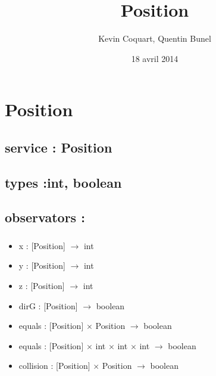 \documentclass[11pt]{article}
\title{Position}
\author{Kevin Coquart, Quentin Bunel}
\date{18 avril 2014}
\begin{document}
\maketitle

\setcounter{tocdepth}{3}
\tableofcontents
\vspace*{1cm}
\section{Position}
\label{sec-1}

\subsection{service : Position}
\label{sec-1.1}

\subsection{types :int, boolean}
\label{sec-1.2}


\subsection{observators :}
\label{sec-1.3}

\subsubsection{}

\begin{itemize}

\item x : [Position] $\to$ int\\
\label{sec-1.3.1.1}


\item y : [Position] $\to$ int\\
\label{sec-1.3.1.2}


\item z : [Position] $\to$ int\\
\label{sec-1.3.1.3}


\item dirG : [Position] $\to$ boolean\\
\label{sec-1.3.1.4}


\item equals : [Position] $\times$ Position $\to$ boolean\\
\label{sec-1.3.1.5}


\item equals : [Position] $\times$ int $\times$ int $\times$ int $\to$ boolean\\
\label{sec-1.3.1.6}


\item collision : [Position] $\times$ Position $\to$ boolean\\
\label{sec-1.3.1.7}


\end{itemize} %
\end{document}
